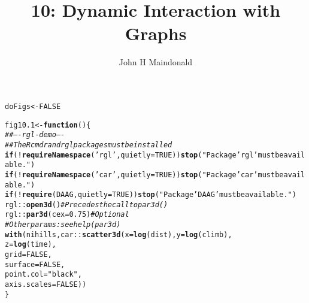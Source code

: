 \documentclass[12pt, a4paper,  BCOR=8.25mm, DIV=15]{scrartcl}\usepackage[]{graphicx}\usepackage[]{color}
\makeatletter
\newcommand{\hlnum}[1]{\textcolor[rgb]{0.686,0.059,0.569}{#1}}%
\newcommand{\hlstr}[1]{\textcolor[rgb]{0.192,0.494,0.8}{#1}}%
\newcommand{\hlcom}[1]{\textcolor[rgb]{0.678,0.584,0.686}{\textit{#1}}}%
\newcommand{\hlopt}[1]{\textcolor[rgb]{0,0,0}{#1}}%
\newcommand{\hlstd}[1]{\textcolor[rgb]{0.345,0.345,0.345}{#1}}%
\newcommand{\hlkwa}[1]{\textcolor[rgb]{0.161,0.373,0.58}{\textbf{#1}}}%
\newcommand{\hlkwb}[1]{\textcolor[rgb]{0.69,0.353,0.396}{#1}}%
\newcommand{\hlkwc}[1]{\textcolor[rgb]{0.333,0.667,0.333}{#1}}%
\newcommand{\hlkwd}[1]{\textcolor[rgb]{0.737,0.353,0.396}{\textbf{#1}}}%
\newenvironment{kframe}{%
 \def\at@end@of@kframe{}%
 \ifinner\ifhmode%
  \def\at@end@of@kframe{\end{minipage}}%
  \begin{minipage}{\columnwidth}%
 \fi\fi%
 \def\FrameCommand##1{\hskip\@totalleftmargin \hskip-\fboxsep
 \colorbox{shadecolor}{##1}\hskip-\fboxsep
     \hskip-\linewidth \hskip-\@totalleftmargin \hskip\columnwidth}%
 \MakeFramed {\advance\hsize-\width
   \@totalleftmargin\z@ \linewidth\hsize
   \@setminipage}}%
 {\par\unskip\endMakeFramed%
 \at@end@of@kframe}
\newenvironment{knitrout}{}{} %
\makeatother
\begin{document}



\title{10: Dynamic Interaction with Graphs}
\author{John H Maindonald}
\maketitle

\begin{knitrout}
\color{fgcolor}\begin{kframe}
\begin{alltt}
\hlstd{doFigs} \hlkwb{<-} \hlnum{FALSE}
\end{alltt}
\end{kframe}
\end{knitrout}

\begin{knitrout}
\color{fgcolor}\begin{kframe}
\begin{alltt}
\hlstd{fig10.1} \hlkwb{<-} \hlkwa{function}\hlstd{()\{}
\hlcom{## ---- rgl-demo ----}
\hlcom{## The Rcmdr and rgl packages must be installed}
\hlkwa{if}\hlstd{(}\hlopt{!}\hlkwd{requireNamespace}\hlstd{(}\hlstr{'rgl'}\hlstd{,} \hlkwc{quietly}\hlstd{=}\hlnum{TRUE}\hlstd{))}\hlkwd{stop}\hlstd{(}\hlstr{"Package 'rgl' must be available."}\hlstd{)}
\hlkwa{if}\hlstd{(}\hlopt{!}\hlkwd{requireNamespace}\hlstd{(}\hlstr{'car'}\hlstd{,} \hlkwc{quietly}\hlstd{=}\hlnum{TRUE}\hlstd{))}\hlkwd{stop}\hlstd{(}\hlstr{"Package 'car' must be available."}\hlstd{)}
\hlkwa{if}\hlstd{(}\hlopt{!}\hlkwd{require}\hlstd{(DAAG,} \hlkwc{quietly}\hlstd{=}\hlnum{TRUE}\hlstd{))}\hlkwd{stop}\hlstd{(}\hlstr{"Package 'DAAG' must be available."}\hlstd{)}
\hlstd{rgl}\hlopt{::}\hlkwd{open3d}\hlstd{()}            \hlcom{# Precedes the call to par3d()}
\hlstd{rgl}\hlopt{::}\hlkwd{par3d}\hlstd{(}\hlkwc{cex}\hlstd{=}\hlnum{0.75}\hlstd{)}     \hlcom{# Optional}
                         \hlcom{# Other params: see help(par3d)}
\hlkwd{with}\hlstd{(nihills, car}\hlopt{::}\hlkwd{scatter3d}\hlstd{(}\hlkwc{x}\hlstd{=}\hlkwd{log}\hlstd{(dist),} \hlkwc{y}\hlstd{=}\hlkwd{log}\hlstd{(climb),}
                        \hlkwc{z}\hlstd{=}\hlkwd{log}\hlstd{(time),}
                        \hlkwc{grid}\hlstd{=}\hlnum{FALSE}\hlstd{,}
                        \hlkwc{surface}\hlstd{=}\hlnum{FALSE}\hlstd{,}
                        \hlkwc{point.col}\hlstd{=}\hlstr{"black"}\hlstd{,}
                        \hlkwc{axis.scales}\hlstd{=}\hlnum{FALSE}\hlstd{))}
\hlstd{\}}
\end{alltt}
\end{kframe}
\end{knitrout}
\end{document}

